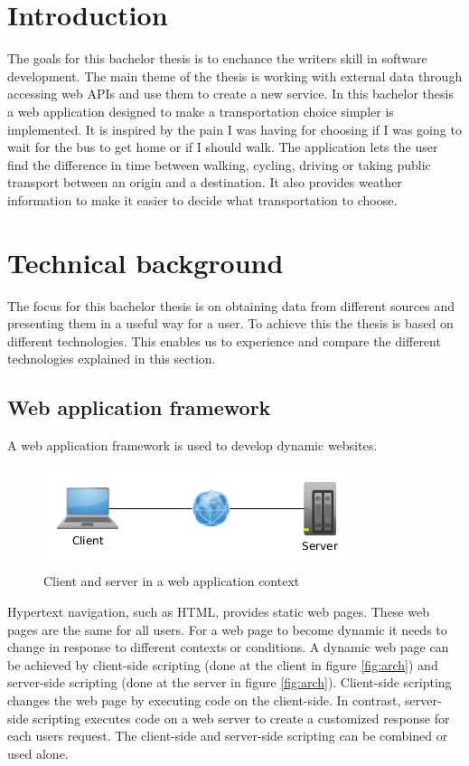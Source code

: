 \documentclass[10pt,a4paper]{article}
\begin{document}
\tableofcontents
\newpage
\section{Introduction}
The goals for this bachelor thesis is to enchance the writers skill in software development. The main theme of the thesis is working with external data through accessing web APIs and use them to create a new service. In this bachelor thesis a web application designed to make a transportation choice simpler is implemented. It is inspired by the pain I was having for choosing if I was going to wait for the bus to get home or if I should walk. The application lets the user find the difference in time between walking, cycling, driving or taking public transport between an origin and a destination. It also provides weather information to make it easier to decide what transportation to choose.
\section{Technical background}
The focus for this bachelor thesis is on obtaining data from different sources and presenting them in a useful way for a user. To achieve this the thesis is based on different technologies. This enables us to experience and compare the different technologies explained in this section.

\subsection{Web application framework}
A web application framework is used to develop dynamic websites. 
\begin{figure}[center]
  \centering
  \includegraphics[width=0.5\linewidth]{../webframework/webframe}
  \caption{Client and server in a web application context}
  \label{fig:webapp}
\end{figure}


Hypertext navigation, such as HTML, provides static web pages. These web pages are the same for all users. For a web page to become dynamic it needs to change in response to different contexts or conditions. A dynamic web page can be achieved by client-side scripting (done at the client in figure \ref{fig:arch}) and server-side scripting (done at the server in figure \ref{fig:arch}). Client-side scripting changes the web page by executing code on the client-side. In contrast, server-side scripting executes code on a web server to create a customized response for each users request. The client-side and server-side scripting can be combined or used alone. \cite{webapp}
\end{document}
